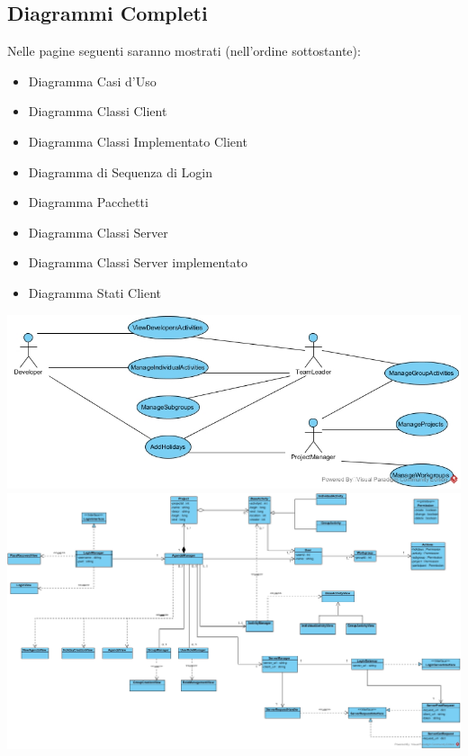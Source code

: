 \documentclass[12pt]{scrartcl}
\begin{document}
\subsection{Diagrammi Completi}
Nelle pagine seguenti saranno mostrati (nell'ordine sottostante):
    \begin{itemize}
    \item Diagramma Casi d'Uso
    \item Diagramma Classi Client
    \item Diagramma Classi Implementato Client
    \item Diagramma di Sequenza di Login
    \item Diagramma Pacchetti
    \item Diagramma Classi Server
    \item Diagramma Classi Server implementato
    \item Diagramma Stati Client
    \end{itemize}
\includegraphics[angle=90,origin=c,scale=0.7]{ManageIT_UseCase.jpg}\\
\includegraphics[angle=90,origin=c,scale=0.45]{ManageIT_Client_DomainClassDiagram.jpg}\\
\end{document}
